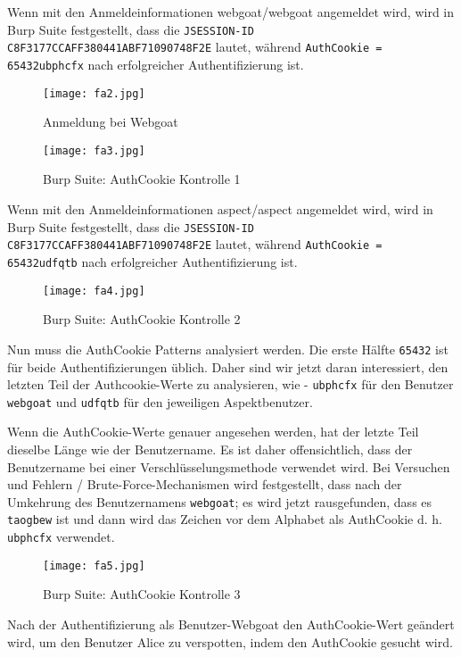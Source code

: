 Wenn mit den Anmeldeinformationen webgoat/webgoat angemeldet wird, wird in Burp Suite festgestellt, dass die \texttt{JSESSION-ID C8F3177CCAFF380441ABF71090748F2E} lautet, während \texttt{AuthCookie = 65432ubphcfx} nach erfolgreicher Authentifizierung ist.

\begin{figure}[h]
	\centering
	\texttt{[image: fa2.jpg]}
	\caption{Anmeldung bei Webgoat}
\end{figure}

\begin{figure}[h]
	\centering
	\texttt{[image: fa3.jpg]}
	\caption{Burp Suite: AuthCookie Kontrolle 1}
\end{figure}

Wenn mit den Anmeldeinformationen aspect/aspect angemeldet wird, wird in Burp Suite festgestellt, dass die \texttt{JSESSION-ID C8F3177CCAFF380441ABF71090748F2E} lautet, während \texttt{AuthCookie = 65432udfqtb} nach erfolgreicher Authentifizierung ist.

\begin{figure}[h]
	\centering
	\texttt{[image: fa4.jpg]}
	\caption{Burp Suite: AuthCookie Kontrolle 2}
\end{figure}

\newpage

Nun muss die AuthCookie Patterns analysiert werden. Die erste Hälfte \texttt{65432} ist für beide Authentifizierungen üblich. Daher sind wir jetzt daran interessiert, den letzten Teil der Authcookie-Werte zu analysieren, wie - \texttt{ubphcfx} für den Benutzer \texttt{webgoat} und \texttt{udfqtb} für den jeweiligen Aspektbenutzer.

Wenn die AuthCookie-Werte genauer angesehen werden, hat der letzte Teil dieselbe Länge wie der Benutzername. Es ist daher offensichtlich, dass der Benutzername bei einer Verschlüsselungsmethode verwendet wird. Bei Versuchen und Fehlern / Brute-Force-Mechanismen wird festgestellt, dass nach der Umkehrung des Benutzernamens \texttt{webgoat}; es wird jetzt rausgefunden, dass es \texttt{taogbew} ist und dann wird das Zeichen vor dem Alphabet als AuthCookie d. h. \texttt{ubphcfx} verwendet.

\begin{figure}[h]
	\centering
	\texttt{[image: fa5.jpg]}
	\caption{Burp Suite: AuthCookie Kontrolle 3}
\end{figure}

Nach der Authentifizierung als Benutzer-Webgoat den AuthCookie-Wert geändert wird, um den Benutzer Alice zu verspotten, indem den AuthCookie gesucht wird.

